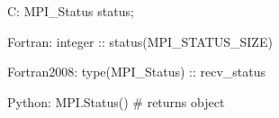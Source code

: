 C:
MPI_Status status;

Fortran:
integer :: status(MPI_STATUS_SIZE)

Fortran2008:
type(MPI_Status) :: recv_status

Python:
MPI.Status() # returns object


